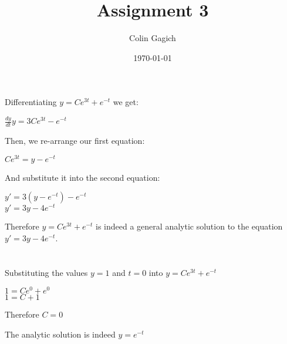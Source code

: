 \documentclass[]{article}
\title{Assignment 3}
\author{Colin Gagich}
\date{\today}
\begin{document}
\maketitle

\section{}

Differentiating $y = C e^{3t} + e^{-t}$ we get:

\begin{center}
$\frac{dy}{dt} y = 3 C e^{3t} - e^{-t}$
\end{center}

Then, we re-arrange our first equation:

\begin{center}
$C e^{3t} = y - e^{-t}$
\end{center}

And substitute it into the second equation:

\begin{center}
$y' = 3 (y - e^{-t}) - e^{-t}$ \\
$y' = 3 y - 4 e^{-t}$\\
\end{center}

\noindent Therefore $y = C e^{3t} + e^{-t}$ is indeed a general analytic solution to the equation $y' = 3 y - 4 e^{-t}$.

\section{}

Substituting the values $y = 1$ and $t = 0$ into $y = C e^{3t} + e^{-t}$

\begin{center}
$1 = C e^{0} + e^{0}$ \\
$1 = C + 1$ \\
\end{center}

\noindent Therefore $C = 0$

The analytic solution is indeed $y = e^{-t}$
\end{document}

